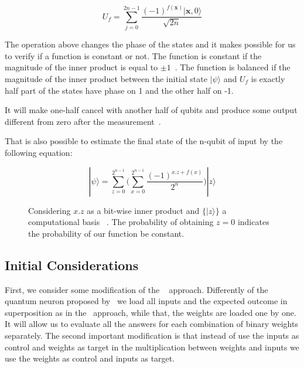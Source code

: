 \documentclass[conference]{IEEEtran}
\begin{document}
 \begin{equation}
    U_f = \sum_{j=0}^{2n-1} \frac{{(-1)}^{f(\textbf{x})}|\textbf{x},0\rangle}{\sqrt{2n}}
 \end{equation}

 The operation above changes the phase of the states and it makes possible for us to verify if a function is constant or
 not.
 The function is constant if the magnitude of the inner product is equal to
 \(\pm 1\)~\cite{deutsch1992rapid,yanofsky2008quantum}.
 The function is balanced if the magnitude of the inner product between the initial state \(|\psi\rangle\)
 and \(U_f\) is exactly half part of the states have phase on 1 and the other half on -1.

 It will make one-half cancel with another half of qubits and produce some output different from zero after the
 measurement~\cite{deutsch1992rapid,nielsen2002quantum}.

 That is also possible to estimate the final state of the n-qubit of input by the following equation:

\renewcommand{\figurename}{Fig.}
 \begin{figure}[ht!]
     \begin{equation}
        |\psi\rangle = \sum_{z=0}^{2^{n-1}} \Bigg(\sum_{x=0}^{2^{n-1}} \frac{{(-1)}^{x.z +f(x)}}{2^n}\Bigg)|z\rangle
    \end{equation}
     \caption{Considering \(x.z\) as a bit-wise inner product and \(\{|z\rangle\}\) a computational basis
     ~\cite{benatti2003deciding}.
     The probability of obtaining \(z=0\) indicates the probability of our function be constant.}
 \end{figure}

\subsection{Initial Considerations}\label{subsec:quantum-neuron-evaluation}

 First, we consider some modification of the ~\cite{fawaz2019training} approach.
Differently of the quantum neuron proposed by~\cite{fawaz2019training} we load all inputs and the expected outcome in
superposition as in the~\cite{Trugenberger_2001} approach, while that, the weights are loaded one by one.
It will allow us to evaluate all the answers for each combination of binary weights separately.
The second important modification is that instead of use the inputs as control and weights as target in the multiplication
between weights and inputs we use the weights as control and inputs as target.
\end{document}
